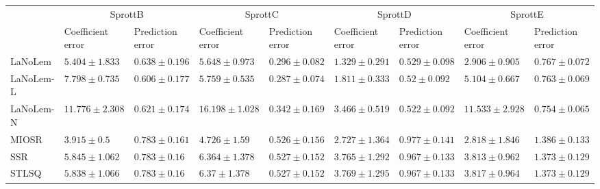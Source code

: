 \begin{table*}
{\begin{tabular}{lllllllll}
 & \multicolumn{2}{c}{SprottB} & \multicolumn{2}{c}{SprottC} & \multicolumn{2}{c}{SprottD} & \multicolumn{2}{c}{SprottE} \\
 & Coefficient error & Prediction error & Coefficient error & Prediction error & Coefficient error & Prediction error & Coefficient error & Prediction error \\
\midrule
LaNoLem & $5.404\pm 1.833$ & $0.638\pm 0.196$ & $5.648\pm 0.973$ & $0.296\pm 0.082$ & $\mathbf{1.329}\pm 0.291$ & $0.529\pm 0.098$ & $2.906\pm 0.905$ & $0.767\pm 0.072$ \\
LaNoLem-L & $7.798\pm 0.735$ & $\mathbf{0.606}\pm 0.177$ & $5.759\pm 0.535$ & $\mathbf{0.287}\pm 0.074$ & $1.811\pm 0.333$ & $\mathbf{0.52}\pm 0.092$ & $5.104\pm 0.667$ & $0.763\pm 0.069$ \\
LaNoLem-N & $11.776\pm 2.308$ & $0.621\pm 0.174$ & $16.198\pm 1.028$ & $0.342\pm 0.169$ & $3.466\pm 0.519$ & $0.522\pm 0.092$ & $11.533\pm 2.928$ & $\mathbf{0.754}\pm 0.065$ \\
MIOSR & $\mathbf{3.915}\pm 0.5$ & $0.783\pm 0.161$ & $\mathbf{4.726}\pm 1.59$ & $0.526\pm 0.156$ & $2.727\pm 1.364$ & $0.977\pm 0.141$ & $\mathbf{2.818}\pm 1.846$ & $1.386\pm 0.133$ \\
SSR & $5.845\pm 1.062$ & $0.783\pm 0.16$ & $6.364\pm 1.378$ & $0.527\pm 0.152$ & $3.765\pm 1.292$ & $0.967\pm 0.133$ & $3.813\pm 0.962$ & $1.373\pm 0.129$ \\
STLSQ & $5.838\pm 1.066$ & $0.783\pm 0.16$ & $6.37\pm 1.378$ & $0.527\pm 0.152$ & $3.769\pm 1.295$ & $0.967\pm 0.133$ & $3.817\pm 0.964$ & $1.373\pm 0.129$ \\

\midrule


\end{tabular}}
\end{table*}
